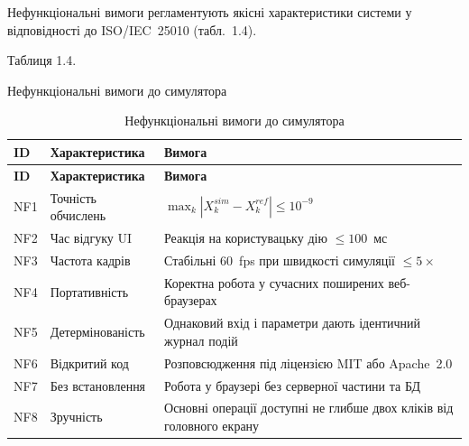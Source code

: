 \documentclass[
]{article}
\begin{document}
Нефункціональні вимоги регламентують якісні характеристики системи у
відповідності до ISO/IEC~25010 (табл.~1.4).

Таблиця 1.4.

Нефункціональні вимоги до симулятора

\begin{longtable}[]{@{}
  >{\raggedright\arraybackslash}p{}
  >{\raggedright\arraybackslash}p{}
  >{\raggedright\arraybackslash}p{}@{}}
\caption[Нефункціональні вимоги до симулятора]{Нефункціональні вимоги до
симулятора}\tabularnewline
\toprule\noalign{}
\begin{minipage}[b]{\linewidth}\raggedright
\textbf{ID}
\end{minipage} & \begin{minipage}[b]{\linewidth}\raggedright
\textbf{Характеристика}
\end{minipage} & \begin{minipage}[b]{\linewidth}\raggedright
\textbf{Вимога}
\end{minipage} \\
\midrule\noalign{}
\endfirsthead
\toprule\noalign{}
\begin{minipage}[b]{\linewidth}\raggedright
\textbf{ID}
\end{minipage} & \begin{minipage}[b]{\linewidth}\raggedright
\textbf{Характеристика}
\end{minipage} & \begin{minipage}[b]{\linewidth}\raggedright
\textbf{Вимога}
\end{minipage} \\
\midrule\noalign{}
\endhead
\bottomrule\noalign{}
\endlastfoot
NF1 & Точність обчислень &
\(\max_{k}|X_{k}^{sim} - X_{k}^{ref}| \leq 10^{- 9}\) \\
NF2 & Час відгуку UI & Реакція на користувацьку дію \(\leq 100\)~мс \\
NF3 & Частота кадрів & Стабільні 60~fps при швидкості симуляції
\(\leq 5 \times\) \\
NF4 & Портативність & Коректна робота у сучасних поширених
веб-браузерах \\
NF5 & Детермінованість & Однаковий вхід і параметри дають ідентичний
журнал подій \\
NF6 & Відкритий код & Розповсюдження під ліцензією MIT або Apache~2.0 \\
NF7 & Без встановлення & Робота у браузері без серверної частини та
БД \\
NF8 & Зручність & Основні операції доступні не глибше двох кліків від
головного екрану \\
\end{longtable}
\end{document}
